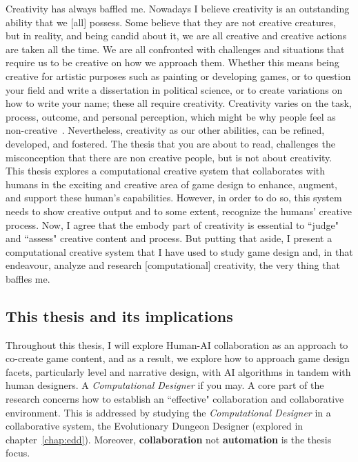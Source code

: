 Creativity has always baffled me. Nowadays I believe creativity is an outstanding ability that we [all] possess. Some believe that they are not creative creatures, but in reality, and being candid about it, we are all creative and creative actions are taken all the time. We are all confronted with challenges and situations that require us to be creative on how we approach them. Whether this means being creative for artistic purposes such as painting or developing games, or to question your field and write a dissertation in political science, or to create variations on how to write your name; these all require creativity. Creativity varies on the task, process, outcome, and personal perception, which might be why people feel as non-creative~\cite{kaufman_beyond_2009}. Nevertheless, creativity as our other abilities, can be refined, developed, and fostered. The thesis that you are about to read, challenges the misconception that there are non creative people, but is not about creativity. This thesis explores a computational creative system that collaborates with humans in the exciting and creative area of game design to enhance, augment, and support these human's capabilities. However, in order to do so, this system needs to show creative output and to some extent, recognize the humans' creative process. Now, I agree that the embody part of creativity is essential to ``judge" and ``assess" creative content and process. But putting that aside, I present a computational creative system that I have used to study game design and, in that endeavour, analyze and research [computational] creativity, the very thing that baffles me.

\subsection*{This thesis and its implications}


Throughout this thesis, I will explore Human-AI collaboration as an approach to co-create game content, and as a result, we explore how to approach game design facets, particularly level and narrative design, with AI algorithms in tandem with human designers. A \emph{Computational Designer} if you may. A core part of the research concerns how to establish an ``effective" collaboration and collaborative environment. This is addressed by studying the \emph{Computational Designer} in a collaborative system, the Evolutionary Dungeon Designer (explored in chapter~\ref{chap:edd}). Moreover, \textbf{collaboration} not \textbf{automation} is the thesis focus. 

